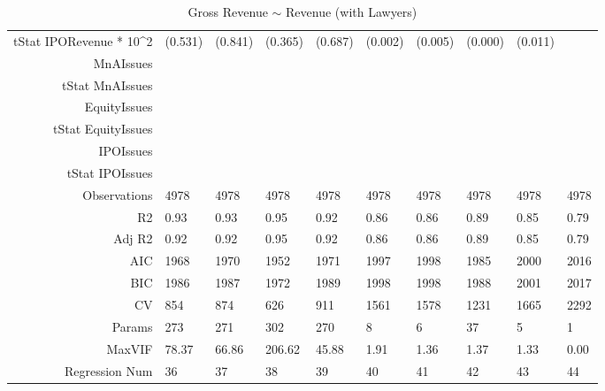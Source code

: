 \begin{table}[ht]
\begin{tabular}{rlllllllll}
  tStat IPORevenue * 10^2 & (0.531) & (0.841) & (0.365) & (0.687) & (0.002) & (0.005) & (0.000) & (0.011) &  \\ 
  MnAIssues &  &  &  &  &  &  &  &  &  \\ 
  tStat MnAIssues &  &  &  &  &  &  &  &  &  \\ 
  EquityIssues &  &  &  &  &  &  &  &  &  \\ 
  tStat EquityIssues &  &  &  &  &  &  &  &  &  \\ 
  IPOIssues &  &  &  &  &  &  &  &  &  \\ 
  tStat IPOIssues &  &  &  &  &  &  &  &  &  \\ 
  Observations & 4978 & 4978 & 4978 & 4978 & 4978 & 4978 & 4978 & 4978 & 4978 \\ 
  R2 & 0.93 & 0.93 & 0.95 & 0.92 & 0.86 & 0.86 & 0.89 & 0.85 & 0.79 \\ 
  Adj R2 & 0.92 & 0.92 & 0.95 & 0.92 & 0.86 & 0.86 & 0.89 & 0.85 & 0.79 \\ 
  AIC & 1968 & 1970 & 1952 & 1971 & 1997 & 1998 & 1985 & 2000 & 2016 \\ 
  BIC & 1986 & 1987 & 1972 & 1989 & 1998 & 1998 & 1988 & 2001 & 2017 \\ 
  CV & 854 & 874 & 626 & 911 & 1561 & 1578 & 1231 & 1665 & 2292 \\ 
  Params & 273 & 271 & 302 & 270 & 8 & 6 & 37 & 5 & 1 \\ 
  MaxVIF & 78.37 & 66.86 & 206.62 & 45.88 & 1.91 & 1.36 & 1.37 & 1.33 & 0.00 \\ 
  Regression Num & 36 & 37 & 38 & 39 & 40 & 41 & 42 & 43 & 44 \\ 
   \hline
\end{tabular}
\caption{Gross Revenue $\sim$ Revenue (with Lawyers)} 
\end{table}
